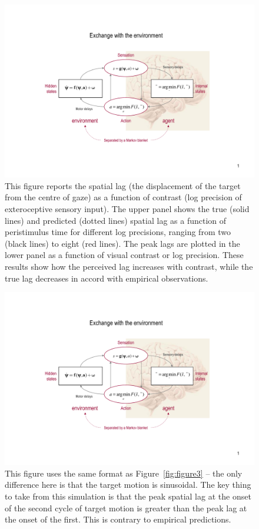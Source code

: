 \documentclass[a4paper]{article} %
\begin{document}
\begin{figure}%
 \centerline{%
 \includegraphics[width=.8\columnwidth, clip, trim = 7cm 1cm 7cm .4cm, page=5]{Figures_slides.pdf} %
}%
\caption{ This figure reports the spatial lag (the displacement
of the target from the centre of gaze) as a function of contrast (log
precision of exteroceptive sensory input). The upper panel shows the
true (solid lines) and predicted (dotted lines) spatial lag as a
function of peristimulus time for different log precisions, ranging from
two (black lines) to eight (red lines). The peak lags are plotted in the
lower panel as a function of visual contrast or log precision. These
results show how the perceived lag increases with contrast, while the
true lag decreases in accord with empirical observations.}%
\label{fig:figure5}
\end{figure}

\begin{figure}%
 \centerline{%
 \includegraphics[width=.8\columnwidth, clip, trim = 5.5cm .5cm 6cm .4cm, page=6]{Figures_slides.pdf} %
}%
\caption{This figure uses the same format as Figure~\ref{fig:figure3} -- the
only difference here is that the target motion is sinusoidal. The key
thing to take from this simulation is that the peak spatial lag at the
onset of the second cycle of target motion is greater than the peak lag
at the onset of the first. This is contrary to empirical predictions.}%
\label{fig:figure6}
\end{figure}
\end{document}
